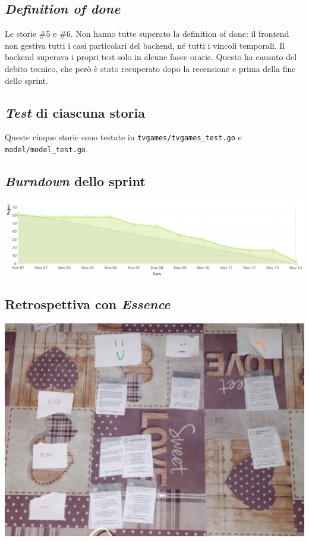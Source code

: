 \documentclass{article}
\begin{document}
\subsection{\emph{Definition of done}}

Le storie \#5 e \#6. Non hanno tutte superato la definition of
done: il frontend non gestiva tutti i casi particolari del backend, né tutti i
vincoli temporali. Il backend superava i propri test solo in alcune fasce
orarie. Questo ha causato del debito tecnico, che però è stato recuperato dopo
la recensione e prima della fine dello sprint.

\subsection{\emph{Test} di ciascuna storia}

Queste cinque storie sono testate in \verb!tvgames/tvgames_test.go! e
\verb!model/model_test.go!.

\subsection{\emph{Burndown} dello sprint}

\includegraphics[width=\textwidth]{burndown-2}

\subsection{Retrospettiva con \emph{Essence}}

\includegraphics[width=\textwidth]{essence-2}
\end{document}

